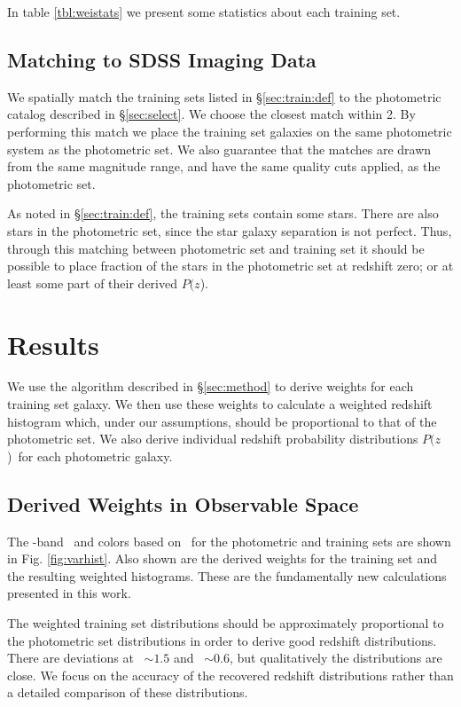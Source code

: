 \documentclass[preprint]{aastex}
\newcommand{\pofz}{$P(z$)}
\newcommand{\matchrad}{2\arcsec}
\begin{document}
In table \ref{tbl:weistats} we present some statistics about each training set.


\subsection{Matching to SDSS Imaging Data} \label{sec:train:match}

We spatially match the training sets listed in \S \ref{sec:train:def} to the
photometric catalog described in \S \ref{sec:select}.  We choose the closest
match within \matchrad.  By performing this match we place the training set
galaxies on the same photometric system as the photometric set.  We also
guarantee that the matches are drawn from the same magnitude range, and have
the same quality cuts applied, as the photometric set.

As noted in \S \ref{sec:train:def}, the training sets contain some stars.
There are also stars in the photometric set, since the star galaxy separation
is not perfect.  Thus, through this matching between photometric set and
training set it should be possible to place fraction of the stars in the
photometric set at redshift zero; or at least some part of their derived \pofz.

\section{Results} \label{sec:results}

We use the algorithm described in \S \ref{sec:method} to derive weights for
each training set galaxy.  We then use these weights to calculate a weighted
redshift histogram which, under our assumptions, should be proportional to that
of the photometric set.  We also derive individual redshift probability
distributions \pofz\ for each photometric galaxy.

\subsection{Derived Weights in Observable Space}

The \rmag-band \cmodelmag\ and colors based on \modelmag\ for the photometric
and training sets are shown in Fig. \ref{fig:varhist}.  Also shown are the
derived weights for the training set and the resulting weighted histograms.
These are the fundamentally new calculations presented in this work.

The weighted training set distributions should be approximately proportional to
the photometric set distributions in order to derive good redshift
distributions.  There are deviations at \gmr\ $\sim 1.5$ and \rmi\ $\sim 0.6$,
but qualitatively the distributions are close.  We focus on the accuracy of the
recovered redshift distributions rather than a detailed comparison of these
distributions.
\end{document}
